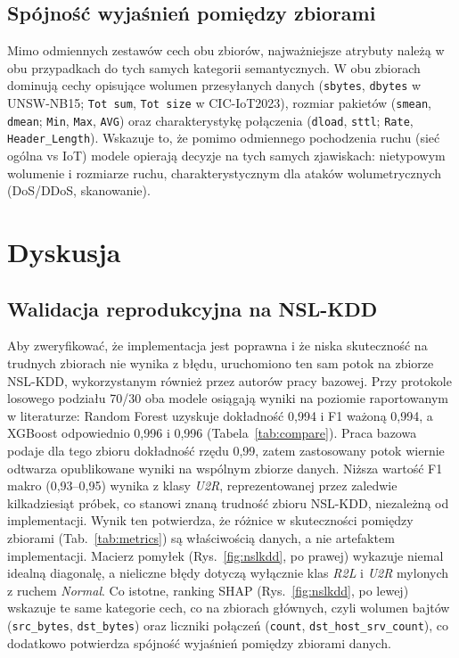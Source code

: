 \documentclass[conference]{IEEEtran}
\begin{document}
\subsection{Spójność wyjaśnień pomiędzy zbiorami}
Mimo odmiennych zestawów cech obu zbiorów, najważniejsze atrybuty należą w obu przypadkach do tych samych kategorii semantycznych. W obu zbiorach dominują cechy opisujące wolumen przesyłanych danych (\texttt{sbytes}, \texttt{dbytes} w UNSW-NB15; \texttt{Tot sum}, \texttt{Tot size} w CIC-IoT2023), rozmiar pakietów (\texttt{smean}, \texttt{dmean}; \texttt{Min}, \texttt{Max}, \texttt{AVG}) oraz charakterystykę połączenia (\texttt{dload}, \texttt{sttl}; \texttt{Rate}, \texttt{Header\_Length}). Wskazuje to, że pomimo odmiennego pochodzenia ruchu (sieć ogólna vs IoT) modele opierają decyzje na tych samych zjawiskach: nietypowym wolumenie i rozmiarze ruchu, charakterystycznym dla ataków wolumetrycznych (DoS/DDoS, skanowanie).

\section{Dyskusja}
\subsection{Walidacja reprodukcyjna na NSL-KDD}
Aby zweryfikować, że implementacja jest poprawna i że niska skuteczność na trudnych zbiorach nie wynika z błędu, uruchomiono ten sam potok na zbiorze NSL-KDD, wykorzystanym również przez autorów pracy bazowej. Przy protokole losowego podziału 70/30 oba modele osiągają wyniki na poziomie raportowanym w literaturze: Random Forest uzyskuje dokładność 0,994 i F1 ważoną 0,994, a XGBoost odpowiednio 0,996 i 0,996 (Tabela~\ref{tab:compare}). Praca bazowa~\cite{arreche2024xaiids} podaje dla tego zbioru dokładność rzędu 0,99, zatem zastosowany potok wiernie odtwarza opublikowane wyniki na wspólnym zbiorze danych. Niższa wartość F1 makro (0,93--0,95) wynika z klasy \emph{U2R}, reprezentowanej przez zaledwie kilkadziesiąt próbek, co stanowi znaną trudność zbioru NSL-KDD, niezależną od implementacji. Wynik ten potwierdza, że różnice w skuteczności pomiędzy zbiorami (Tab.~\ref{tab:metrics}) są właściwością danych, a nie artefaktem implementacji. Macierz pomyłek (Rys.~\ref{fig:nslkdd}, po prawej) wykazuje niemal idealną diagonalę, a nieliczne błędy dotyczą wyłącznie klas \emph{R2L} i \emph{U2R} mylonych z ruchem \emph{Normal}. Co istotne, ranking SHAP (Rys.~\ref{fig:nslkdd}, po lewej) wskazuje te same kategorie cech, co na zbiorach głównych, czyli wolumen bajtów (\texttt{src\_bytes}, \texttt{dst\_bytes}) oraz liczniki połączeń (\texttt{count}, \texttt{dst\_host\_srv\_count}), co dodatkowo potwierdza spójność wyjaśnień pomiędzy zbiorami danych.
\end{document}
